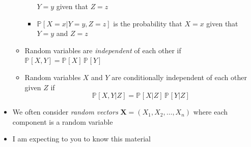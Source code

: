 \documentclass[11pt]{article}
\newcommand{\Prob}[2][]{\mathbb{P}_{#1\!}\left[ #2 \right]}
\begin{document}
\begin{itemize}
\begin{itemize}
\begin{itemize}
\(Y=y\) given that \(Z=z\)
\item \(\Prob{X=x|Y=y,Z=z}\) is the probability that \(X=x\) given
that \(Y=y\) and \(Z=z\)
\end{itemize}
\item Random variables are \emph{independent} of each other if
\(\Prob{X,Y} = \Prob{X}\,\Prob{Y}\)
\item Random variables \(X\) and \(Y\) are conditionally independent of
each other given \(Z\) if
$$ \Prob{X,Y|Z} = \Prob{X|Z} \, \Prob{Y|Z} $$
\end{itemize}
\item We often consider \emph{random vectors} \(\bm{X} = (X_1,
     X_2,\ldots,X_n)\) where each component is a random variable
\item I am expecting to you to know this material
\end{itemize}
\end{document}

